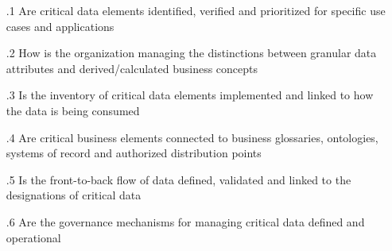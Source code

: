 \begin{itemize}[leftmargin=.5in]

  \item [\thesection.1] Are critical data elements identified, verified and prioritized for specific use cases and applications
  \item [\thesection.2] How is the organization managing the distinctions between granular data attributes and derived/calculated business concepts
  \item [\thesection.3] Is the inventory of critical data elements implemented and linked to how the data is being consumed
  \item [\thesection.4] Are critical business elements connected to business glossaries, ontologies, systems of record and authorized distribution points
  \item [\thesection.5] Is the front-to-back flow of data defined, validated and linked to the designations of critical data
  \item [\thesection.6] Are the governance mechanisms for managing critical data defined and operational

\end{itemize}
